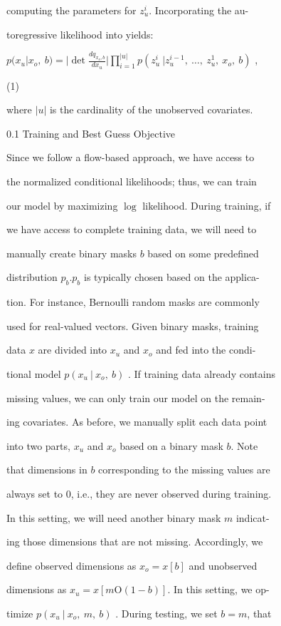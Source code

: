 \documentclass[a4paper,12pt]{article}
\begin{document}
computing the parameters for $z_{u}^{i}$. Incorporating the au-

toregressive likelihood into yields:

$p(x_{u}|x_{o},\displaystyle \ b)=|\det\frac{dq_{x_{o},b}}{dx_{u}}|\prod_{i=1}^{|u|}p(z_{u}^{i}\ |z_{u}^{i-1},\ \ldots,\ z_{u}^{1},\ x_{o},\ b)$ ,

(1)

where $|u|$ is the cardinality of the unobserved covariates.

0.1 Training and Best Guess Objective

Since we follow a flow-based approach, we have access to

the normalized conditional likelihoods; thus, we can train

our model by maximizing $\log$ likelihood. During training, if

we have access to complete training data, we will need to

manually create binary masks $b$ based on some predefined

distribution $p_{b}. p_{b}$ is typically chosen based on the applica-

tion. For instance, Bernoulli random masks are commonly

used for real-valued vectors. Given binary masks, training

data $x$ are divided into $x_{u}$ and $x_{o}$ and fed into the condi-

tional model $p (x_{u}\ |\ x_{o},\ b)$ . If training data already contains

missing values, we can only train our model on the remain-

ing covariates. As before, we manually split each data point

into two parts, $x_{u}$ and $x_{o}$ based on a binary mask $b$. Note

that dimensions in $b$ corresponding to the missing values are

always set to $0$, i.e., they are never observed during training.

In this setting, we will need another binary mask $m$ indicat-

ing those dimensions that are not missing. Accordingly, we

define observed dimensions as $x_{o} = x[b]$ and unobserved

dimensions as $x_{u}=x[m\mathrm{O}(1-b)]$. In this setting, we op-

timize $p (x_{u}\ |\ x_{o},\ m,\ b)$ . During testing, we set $b=m$, that
\end{document}
